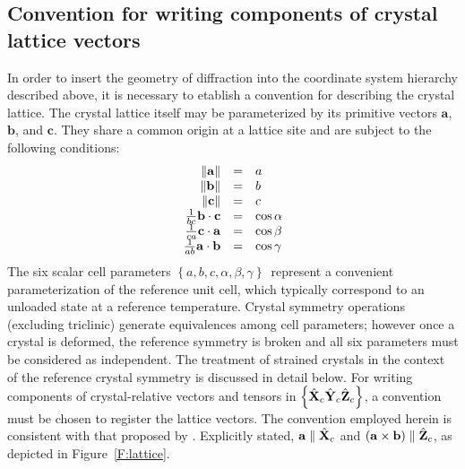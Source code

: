 \documentclass[12pt,letterpaper,final]{amsart}
\newcommand{\mbm}[1]{\ensuremath{\mbox{\boldmath$#1$}}}
\newcommand{\Xc}{\ensuremath{\hat{\mbm{\mathrm{X}}}_c}}
\newcommand{\Yc}{\ensuremath{\hat{\mbm{\mathrm{Y}}}_c}}
\newcommand{\Zc}{\ensuremath{\hat{\mbm{\mathrm{Z}}}_c}}
\newcommand{\xtlframe}{\ensuremath{\left\{\Xc\Yc\Zc\right\}}}
\newcommand{\figref}[1]{Figure~\ref{#1}}
\newcommand{\cella}{\ensuremath{\mathbf{a}}}
\newcommand{\cellb}{\ensuremath{\mathbf{b}}}
\newcommand{\cellc}{\ensuremath{\mathbf{c}}}
\newcommand{\dalfa}{\ensuremath{\alpha}}
\newcommand{\dbeta}{\ensuremath{\beta}}
\newcommand{\dgama}{\ensuremath{\gamma}}
\newcommand{\cellParams}{\ensuremath{\left\{ a,b,c,\dalfa,\dbeta,\dgama \right\}}}
\newcommand{\dotp}[2]{\ensuremath{#1\cdot#2}}
\newcommand{\crossp}[2]{\ensuremath{#1\times#2}}
\begin{document}
\subsection{Convention for writing components of crystal lattice vectors}\label{S:conventions}
In order to insert the geometry of diffraction into the coordinate system hierarchy described above, it is necessary to etablish a convention for describing the crystal lattice. The crystal lattice itself may be
parameterized by its primitive vectors \cella, \cellb, and \cellc.
They share a common origin at a lattice site and are subject to the
following conditions:
\begin{equation}
  \begin{array}{rcl}
    \|\cella\| &=& a\\
    \|\cellb\| &=& b\\
    \|\cellc\| &=& c\\
    {1 \over bc}\dotp{\cellb}{\cellc} &=& \cos\dalfa\\
    {1 \over ca}\dotp{\cellc}{\cella} &=& \cos\dbeta\\
    {1 \over ab}\dotp{\cella}{\cellb} &=& \cos\dgama
  \end{array} \label{E:lattParams}
\end{equation}
The six scalar cell parameters \cellParams\ represent a convenient parameterization of the reference unit cell, which typically correspond to an unloaded state at a reference temperature. Crystal symmetry operations (excluding triclinic) generate equivalences among cell parameters; however once a crystal is deformed, the reference symmetry is broken and all six parameters must be considered as independent.  The treatment of strained crystals in the context of the reference crystal symmetry is discussed in detail below.  For writing components of crystal-relative vectors and tensors in \xtlframe, 
a convention must be chosen to register the lattice vectors.  The
convention employed herein is consistent with that proposed by
\cite{Nye:crysBookAppB}.  Explicitly stated, $\cella\parallel\Xc$ and
$(\crossp{\cella}{\cellb})\parallel\Zc$, as depicted in
\figref{F:lattice}.
\end{document}

